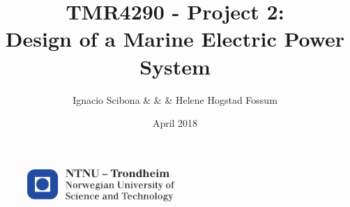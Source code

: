 \documentclass{article}
\author{Ignacio Scibona & \& & Helene Hogstad Fossum}
\date{April 2018}
\title{TMR4290 - Project 2: \\ Design of a Marine Electric Power System}
\begin{document}
\begin{titlepage} 
    \maketitle
    \thispagestyle{empty}
    \begin{figure}
    \centering
    \includegraphics[width=0.5\textwidth]{utils/logontnu_eng.pdf}
    \end{figure}
    
\end{titlepage}



\setcounter{page}{1}
\newpage











\newpage
\thispagestyle{empty}




\newpage
{}
\setcounter{page}{1}

\end{document}
